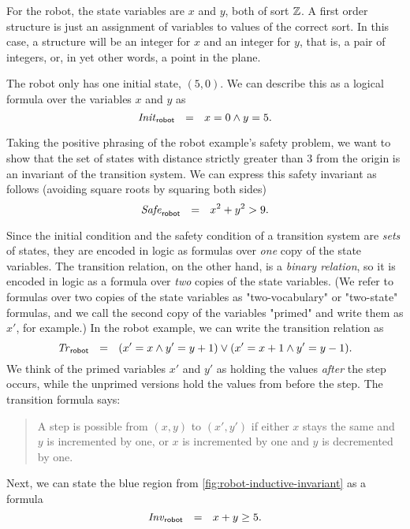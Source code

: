 For the robot, the state variables are $x$ and $y$,
  both of sort $\mathbb{Z}$.
A first order structure is just
  an assignment of variables to values of the correct sort.
In this case, a structure will be an integer for $x$ and an integer for $y$,
  that is, a pair of integers, or, in yet other words, a point in the plane.

The robot only has one initial state, $(5, 0)$.
We can describe this as a logical formula over the variables $x$ and $y$ as
\[
  \mathit{Init}_{\mathsf{robot}} ~~=~~ x = 0 \land y = 5.
\]

Taking the positive phrasing of the robot example's safety problem,
  we want to show that the set of states
  with distance strictly greater than 3 from the origin
  is an invariant of the transition system.
We can express this safety invariant as follows
  (avoiding square roots by squaring both sides)
\[
  \mathit{Safe}_{\mathsf{robot}} ~~=~~ x^2 + y^2 > 9.
\]

Since the initial condition and the safety condition
  of a transition system are \emph{sets} of states,
  they are encoded in logic as formulas over \emph{one} copy of the state variables.
The transition relation, on the other hand, is a \emph{binary relation},
  so it is encoded in logic as a formula over \emph{two} copies of the state variables.
(We refer to formulas over two copies of the state variables as
  "two-vocabulary" or "two-state" formulas,
  and we call the second copy of the variables "primed"
  and write them as $x'$, for example.)
In the robot example, we can write the transition relation as
\[
    \mathit{Tr}_{\mathsf{robot}} ~~=~~ (x' = x \land y' = y + 1) \lor (x' = x + 1 \land y' = y - 1).
\]
We think of the primed variables $x'$ and $y'$ as
  holding the values \emph{after} the step occurs,
while the unprimed versions hold the values from before the step.
The transition formula says:
\begin{quote}
  A step is possible from $(x, y)$ to $(x', y')$ if
    either $x$ stays the same and $y$ is incremented by one,
    or $x$ is incremented by one and $y$ is decremented by one.
\end{quote}

Next, we can state the blue region from \cref{fig:robot-inductive-invariant}
  as a formula
\[
  \mathit{Inv}_{\mathsf{robot}} ~~=~~ x + y \ge 5.
\]

